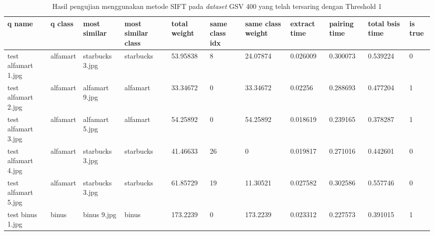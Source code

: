 \begin{landscape}
	\begin{longtable}{|p{2cm}|p{1.5cm}|p{2cm}|p{1.5cm}|p{2cm}|p{1cm}|p{2cm}|p{2cm}|p{2cm}|p{2cm}|p{1cm}|}
		\caption{Hasil pengujian menggunakan metode SIFT pada \textit{dataset} GSV 400 yang telah tersaring dengan Threshold 1} \\
		\hline
		\textbf{q name}      & \textbf{q class} & \textbf{most similar} & \textbf{most similar class} & \textbf{total weight} & \textbf{same class idx} & \textbf{same class weight} & \textbf{extract time} & \textbf{pairing time} & \textbf{total bsis time} & \textbf{is true} \\ \hline
		test alfamart 1.jpg  & alfamart         & starbucks 3.jpg       & starbucks                   & 53.95838              & 8                       & 24.07874                   & 0.026009              & 0.300073              & 0.539224                 & 0                \\ \hline
		test alfamart 2.jpg  & alfamart         & alfamart 9.jpg        & alfamart                    & 33.34672              & 0                       & 33.34672                   & 0.02256               & 0.288693              & 0.477204                 & 1                \\ \hline
		test alfamart 3.jpg  & alfamart         & alfamart 5.jpg        & alfamart                    & 54.25892              & 0                       & 54.25892                   & 0.018619              & 0.239165              & 0.378287                 & 1                \\ \hline
		test alfamart 4.jpg  & alfamart         & starbucks 3.jpg       & starbucks                   & 41.46633              & 26                      & 0                          & 0.019817              & 0.271016              & 0.442601                 & 0                \\ \hline
		test alfamart 5.jpg  & alfamart         & starbucks 3.jpg       & starbucks                   & 61.85729              & 19                      & 11.30521                   & 0.027582              & 0.302586              & 0.557746                 & 0                \\ \hline
		test binus 1.jpg     & binus            & binus 9.jpg           & binus                       & 173.2239              & 0                       & 173.2239                   & 0.023312              & 0.227573              & 0.391015                 & 1                \\ \hline

\end{longtable}
\end{landscape}
